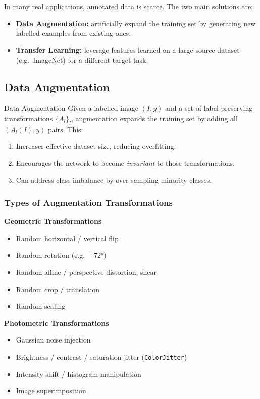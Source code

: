 \documentclass[11pt,a4paper]{article}
\begin{document}
In many real applications, annotated data is scarce. The two main solutions are:
\begin{itemize}
  \item \textbf{Data Augmentation:} artificially expand the training set by generating new labelled examples from existing ones.
  \item \textbf{Transfer Learning:} leverage features learned on a large source dataset (e.g.\ ImageNet) for a different target task.
\end{itemize}

\subsection{Data Augmentation}
\label{sec:augmentation}

\begin{defbox}{Data Augmentation}
Given a labelled image $(I, y)$ and a set of label-preserving transformations $\{A_l\}_l$, augmentation expands the training set by adding all $(A_l(I), y)$ pairs. This:
\begin{enumerate}
  \item Increases effective dataset size, reducing overfitting.
  \item Encourages the network to become \emph{invariant} to those transformations.
  \item Can address class imbalance by over-sampling minority classes.
\end{enumerate}
\end{defbox}

\subsubsection{Types of Augmentation Transformations}

\begin{tcolorbox}[colback=LightBlue,colframe=AccentBlue,boxrule=0.8pt,arc=3pt]
\textbf{Geometric Transformations}
\begin{itemize}
  \item Random horizontal / vertical flip
  \item Random rotation (e.g.\ $\pm72°$)
  \item Random affine / perspective distortion, shear
  \item Random crop / translation
  \item Random scaling
\end{itemize}
\textbf{Photometric Transformations}
\begin{itemize}
  \item Gaussian noise injection
  \item Brightness / contrast / saturation jitter (\texttt{ColorJitter})
  \item Intensity shift / histogram manipulation
  \item Image superimposition
\end{itemize}
\end{tcolorbox}
\end{document}

